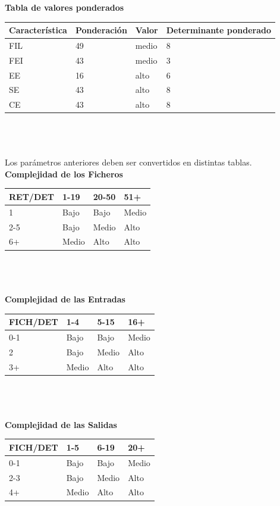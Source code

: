 \documentclass[a4paper,12pt,openany,oneside]{book}
\begin{document}
\textbf{Tabla de valores ponderados}\\
\begin{tabular}{| l | l | l | l |}
\hline
\textbf{Característica} & \textbf{Ponderación} & \textbf{Valor} & \textbf{Determinante ponderado} \\
\hline
FIL & 49 & medio & 8\\
\hline
FEI & 43 & medio & 3\\
\hline
EE & 16  & alto  & 6\\
\hline
SE & 43  & alto  & 8\\
\hline
CE & 43  & alto  & 8\\
\hline
\end{tabular}
\\\\\\
Los parámetros anteriores deben ser convertidos en distintas tablas.\\
\textbf{Complejidad de los Ficheros}\\
\begin{tabular}{| l | l | l | l |}
\hline
\textbf{RET/DET} & \textbf{1-19} & \textbf{20-50} & \textbf{51+} \\
\hline
1 & Bajo & Bajo & Medio\\
\hline
2-5 & Bajo & Medio & Alto\\
\hline
6+ & Medio & Alto & Alto\\
\hline
\end{tabular}
\\\\\\
\textbf{Complejidad de las Entradas}\\
\begin{tabular}{| l | l | l | l |}
\hline
\textbf{FICH/DET} & \textbf{1-4} & \textbf{5-15} & \textbf{16+} \\
\hline
0-1 & Bajo & Bajo & Medio\\
\hline
2 & Bajo & Medio & Alto\\
\hline
3+ & Medio & Alto & Alto\\
\hline
\end{tabular}
\\\\\\
\textbf{Complejidad de las Salidas}\\
\begin{tabular}{| l | l | l | l |}
\hline
\textbf{FICH/DET} & \textbf{1-5} & \textbf{6-19} & \textbf{20+} \\
\hline
0-1 & Bajo & Bajo & Medio\\
\hline
2-3 & Bajo & Medio & Alto\\
\hline
4+ & Medio & Alto & Alto\\
\hline
\end{tabular}
\end{document}
